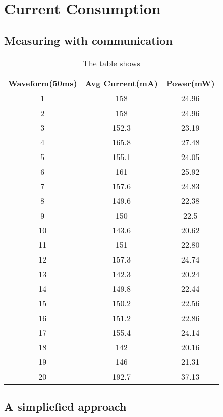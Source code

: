 \chapter{Current Consumption}

\section{Measuring with communication}


\begin{table}[h!]
\begin{center}
 \begin{tabular}{||c c c||} 
 \hline
 Waveform(50ms) & Avg Current(mA) & Power(mW)\\ [0.5ex] 
 \hline\hline
 1 & 158    & 24.96 \\ 
 \hline
 2 & 158    & 24.96 \\
 \hline
 3 & 152.3  & 23.19 \\
 \hline
 4 & 165.8  & 27.48 \\
 \hline
 \rowcolor{red}
 5 & 155.1  & 24.05 \\ 
 \hline
 6 & 161    & 25.92 \\ 
 \hline
 7 & 157.6  & 24.83 \\
 \hline
 8 & 149.6  & 22.38 \\
 \hline
 9 & 150    & 22.5  \\
 \hline
 10 & 143.6 & 20.62 \\ 
 \hline
 11 & 151   & 22.80 \\
  \hline
 12 & 157.3 & 24.74 \\
 \hline
 \rowcolor{red}
 13 & 142.3 & 20.24 \\ 
 \hline
 14 & 149.8 & 22.44 \\ 
 \hline
 15 & 150.2 & 22.56 \\
 \hline
 16 & 151.2 & 22.86 \\
 \hline
 17 & 155.4 & 24.14 \\
 \hline
 18 & 142   & 20.16 \\ 
 \hline
 19 & 146   & 21.31  \\
 \hline
 \rowcolor{red}
 20 & 192.7 & 37.13 \\[1ex]
\end{tabular}
\end{center}
\caption{The table shows}
\label{Table:WIFI_ON}
\end{table}

\section{A simpliefied approach}

